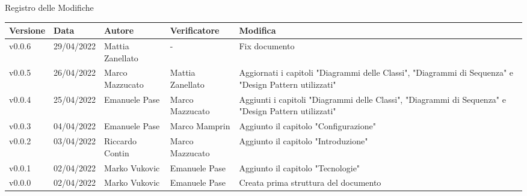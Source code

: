 \begin{center}
  \huge{Registro delle Modifiche}
\end{center}
\renewcommand\arraystretch{1,5}
{\centering
\begin{longtable}{|C{1.8cm}|C{2.1cm}|C{2cm}|C{2.4cm}|L{4.4cm}|}
  \hline
  \textcolor[HTML]{FFFFFF}{\textbf{Versione}} & \textcolor[HTML]{FFFFFF}{\textbf{Data}} & \textcolor[HTML]{FFFFFF}{\textbf{Autore}}  & \textcolor[HTML]{FFFFFF}{\textbf{Verificatore}} & \textcolor[HTML]{FFFFFF}{\textbf{Modifica}}    \\ \hline
  v0.0.6        & 29/04/2022    & Mattia Zanellato   &  -       & Fix documento \\ \hline
  v0.0.5        & 26/04/2022    & Marco Mazzucato   & Mattia Zanellato   & Aggiornati i capitoli "Diagrammi delle Classi", "Diagrammi di Sequenza" e "Design Pattern utilizzati" \\ \hline
  v0.0.4        & 25/04/2022    & Emanuele Pase   &  Marco Mazzucato       & Aggiunti i capitoli "Diagrammi delle Classi", "Diagrammi di Sequenza" e "Design Pattern utilizzati" \\ \hline
  v0.0.3        & 04/04/2022    & Emanuele Pase   &  Marco Mamprin  & Aggiunto il capitolo "Configurazione" \\ \hline
  v0.0.2        & 03/04/2022    & Riccardo Contin   &   Marco Mazzucato   & Aggiunto il capitolo "Introduzione" \\ \hline
  v0.0.1        & 02/04/2022    & Marko Vukovic   & Emanuele Pase         & Aggiunto il capitolo "Tecnologie" \\ \hline
  v0.0.0        & 02/04/2022    & Marko Vukovic   & Emanuele Pase         & Creata prima struttura del documento \\ \hline
\end{longtable}}

\renewcommand\arraystretch{1}
